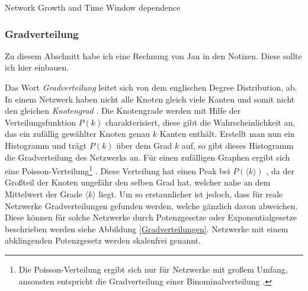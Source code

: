 \documentclass[a4paper,10pt]{scrbook}
\begin{document}
\cite{Krings2012} Network Growth and Time Window dependence


\cite{Kamps2009} 

\subsubsection*{Gradverteilung}

Zu diesem Abschnitt habe ich eine Rechnung von Jan in den Notizen. Diese sollte ich hier einbauen. 

Das Wort \textit{Gradverteilung} leitet sich von dem englischen Degree Distribution, ab. In einem Netzwerk haben nicht alle Knoten gleich viele Kanten und somit nicht den gleichen \textit{Knotengrad} \cite{Albert}. Die Knotengrade werden mit Hilfe der Verteilungsfunktion $P(k)$ charakterisiert, diese gibt die Wahrscheinlichkeit an, das ein zufällig gewählter Knoten genau $k$ Kanten enthält. Erstellt man nun ein Histogramm und trägt $P(k)$ über dem Grad $k$ auf, so gibt dieses Histogramm die Gradverteilung des Netzwerks \cite{Newman} an. Für einen zufälligen Graphen ergibt sich eine Poisson-Verteilung\footnote{Die Poisson-Verteilung ergibt sich nur für Netzwerke mit großem Umfang, ansonsten entspricht die Gradverteilung einer Binominalverteilung \cite{RandomGraphs}.} \cite{RandomGraphs}. Diese Verteilung hat einen Peak bei $P\left(\langle k\rangle\right)$ \cite{Albert}, da der Großteil der Knoten ungefähr den selben Grad hat, welcher nahe an dem Mittelwert der Grade $\langle k\rangle$ liegt. Um so erstaunlicher ist jedoch, dass für reale Netzwerke Gradverteilungen gefunden werden, welche gänzlich davon abweichen. Diese können für solche Netzwerke durch Potenzgesetze oder Exponentialgesetze beschrieben werden \cite{Newman} siehe Abbildung \ref{Gradverteilungen}. Netzwerke mit einem abklingenden Potenzgesetz werden skalenfrei genannt.
\end{document}
